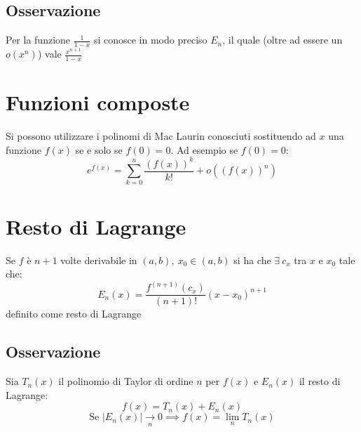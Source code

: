 \subsection{Osservazione}
Per la funzione $\frac{1}{1 - x}$ si conosce in modo preciso $E_n$, il quale (oltre ad essere un $o(x^n)$) vale $\frac{x^{n+1}}{1 - x}$

\section{Funzioni composte}
Si possono utilizzare i polinomi di Mac Laurin conosciuti sostituendo ad $x$ una funzione $f(x)$ se e solo se $f(0) = 0$.
Ad esempio se $f(0) = 0$:\\
\begin{equation}
e^{f(x)} = \sum_{k=0}^n\frac{(f(x))^k}{k!} + o((f(x))^n)
\end{equation}

\section{Resto di Lagrange}
Se $f$ è $n+1$ volte derivabile in $(a,b),\ x_0 \in (a,b)$ si ha che $\exists\ c_x$ tra $x$ e $x_0$ tale che:
\begin{equation}
E_n(x) = \frac{f^{(n+1)}(c_x)}{(n+1)!}(x - x_0)^{n+1}
\end{equation}
definito come resto di Lagrange
\subsection{Osservazione}
Sia $T_n(x)$ il polinomio di Taylor di ordine $n$ per $f(x)$ e $E_n(x)$ il resto di Lagrange:
\begin{equation}
f(x) = T_n(x) + E_n(x)
\end{equation}
\begin{equation} \displaystyle
\text{Se } |E_n(x)| \xrightarrow[n]{}0 \implies f(x) = \lim_{n}T_n(x)
\end{equation}